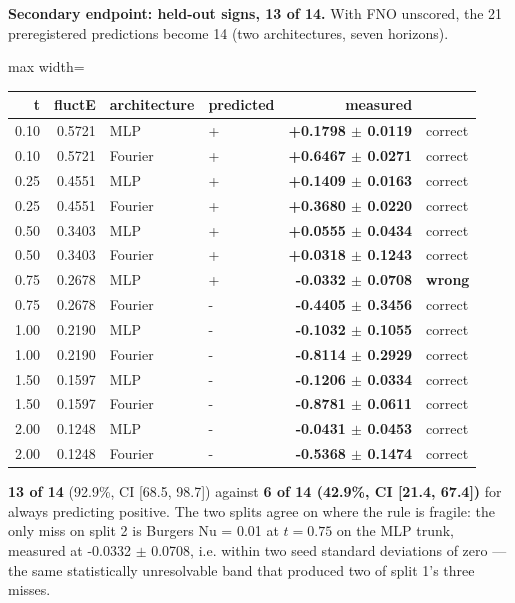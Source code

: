 \documentclass[preprint,12pt]{elsarticle}
\begin{document}
\textbf{Secondary endpoint: held-out signs, 13 of 14.} With FNO unscored, the 21 preregistered predictions become 14 (two architectures, seven horizons).

\begin{center}
\begin{adjustbox}{max width=\linewidth}
\small
\begin{tabular}{rrllrl}
\toprule
t & fluctE & architecture & predicted & measured &  \\
\midrule
0.10 & 0.5721 & MLP & + & \textbf{+0.1798 $\pm$ 0.0119} & correct \\
0.10 & 0.5721 & Fourier & + & \textbf{+0.6467 $\pm$ 0.0271} & correct \\
0.25 & 0.4551 & MLP & + & \textbf{+0.1409 $\pm$ 0.0163} & correct \\
0.25 & 0.4551 & Fourier & + & \textbf{+0.3680 $\pm$ 0.0220} & correct \\
0.50 & 0.3403 & MLP & + & \textbf{+0.0555 $\pm$ 0.0434} & correct \\
0.50 & 0.3403 & Fourier & + & \textbf{+0.0318 $\pm$ 0.1243} & correct \\
0.75 & 0.2678 & MLP & + & \textbf{-0.0332 $\pm$ 0.0708} & \textbf{wrong} \\
0.75 & 0.2678 & Fourier & - & \textbf{-0.4405 $\pm$ 0.3456} & correct \\
1.00 & 0.2190 & MLP & - & \textbf{-0.1032 $\pm$ 0.1055} & correct \\
1.00 & 0.2190 & Fourier & - & \textbf{-0.8114 $\pm$ 0.2929} & correct \\
1.50 & 0.1597 & MLP & - & \textbf{-0.1206 $\pm$ 0.0334} & correct \\
1.50 & 0.1597 & Fourier & - & \textbf{-0.8781 $\pm$ 0.0611} & correct \\
2.00 & 0.1248 & MLP & - & \textbf{-0.0431 $\pm$ 0.0453} & correct \\
2.00 & 0.1248 & Fourier & - & \textbf{-0.5368 $\pm$ 0.1474} & correct \\
\bottomrule
\end{tabular}
\end{adjustbox}
\end{center}


\textbf{13 of 14} (92.9\%, CI [68.5, 98.7]) against \textbf{6 of 14 (42.9\%, CI [21.4, 67.4])} for always predicting positive. The two splits agree on where the rule is fragile: the only miss on split 2 is Burgers Nu = 0.01 at $t = 0.75$ on the MLP trunk, measured at -0.0332 $\pm$ 0.0708, i.e. within two seed standard deviations of zero --- the same statistically unresolvable band that produced two of split 1's three misses.
\end{document}
